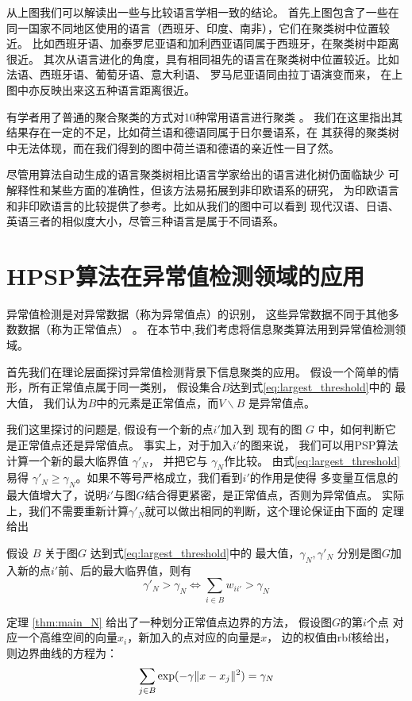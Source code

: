 从上图我们可以解读出一些与比较语言学相一致的结论。
首先上图包含了一些在同一国家不同地区使用的语言（西班牙、印度、南非），它们在聚类树中位置较近。
比如西班牙语、加泰罗尼亚语和加利西亚语同属于西班牙，在聚类树中距离很近。
其次从语言进化的角度，具有相同祖先的语言在聚类树中位置较近。比如法语、西班牙语、葡萄牙语、意大利语、
罗马尼亚语同由拉丁语演变而来，
在上图中亦反映出来这五种语言距离很近。

有学者用了普通的聚合聚类的方式对10种常用语言进行聚类 \cite{al2017characterization} 。
我们在这里指出其结果存在一定的不足，比如荷兰语和德语同属于日尔曼语系，在
其获得的聚类树中无法体现，而在我们得到的图中荷兰语和德语的亲近性一目了然。

尽管用算法自动生成的语言聚类树相比语言学家给出的语言进化树仍面临缺少
可解释性和某些方面的准确性，但该方法易拓展到非印欧语系的研究，
为印欧语言和非印欧语言的比较提供了参考。比如从我们的图中可以看到
现代汉语、日语、英语三者的相似度大小，尽管三种语言是属于不同语系。



\section{HPSP算法在异常值检测领域的应用}
异常值检测是对异常数据（称为异常值点）的识别，
这些异常数据不同于其他多数数据（称为正常值点）
\citep{grubbs1969procedures}。
在本节中,我们考虑将信息聚类算法用到异常值检测领域。

首先我们在理论层面探讨异常值检测背景下信息聚类的应用。
假设一个简单的情形，所有正常值点属于同一类别，
假设集合$B$达到式\eqref{eq:largest_threshold}中的
最大值，
我们认为$B$中的元素是正常值点，而$V\backslash B$ 是异常值点。

我们这里探讨的问题是, 假设有一个新的点$i'$加入到
现有的图 $G$ 中，如何判断它是正常值点还是异常值点。 
事实上，对于加入$i'$的图来说，
我们可以用PSP算法计算一个新的最大临界值
$\gamma'_N$，
并把它与 $\gamma_N$作比较。 由式\eqref{eq:largest_threshold}易得
$\gamma'_N \geq \gamma_N$。如果不等号严格成立，我们看到$i'$的作用是使得
多变量互信息的最大值增大了，说明$i'$与图$G$结合得更紧密，是正常值点，否则为异常值点。
实际上，我们不需要重新计算$\gamma'_N$就可以做出相同的判断，这个理论保证由下面的
定理给出
\begin{theorem}\label{thm:main_N}
  假设 $B$ 关于图$G$ 达到式\eqref{eq:largest_threshold}中的
  最大值，$\gamma_N, \gamma'_N$ 分别是图$G$加入新的点$i'$前、后的最大临界值，则有
\begin{equation}
\gamma'_N > \gamma_N \iff  \sum_{i \in B} w_{ii'} > \gamma_N 
\end{equation}
\end{theorem}
定理 \ref{thm:main_N} 给出了一种划分正常值点边界的方法，
假设图$G$的第$i$个点
对应一个高维空间的向量$x_i$，新加入的点对应的向量是$x$，
边的权值由rbf核给出，则边界曲线的方程为：
\begin{equation}\label{eq:sum_exp_gamma_N}
  \sum_{j \in B} \exp(-\gamma \lVert x - x_j\rVert^2)= \gamma_N
\end{equation}

